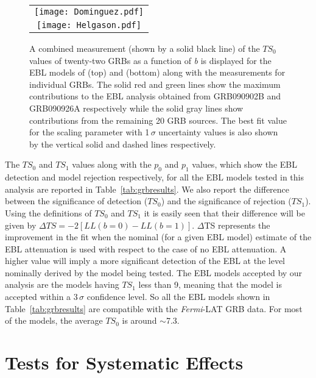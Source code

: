 \documentclass[12pt,preprint]{aastex}
\begin{document}
\begin{figure*}[ht!]
  \begin{center}
  \begin{tabular}{c}
    \texttt{[image: Dominguez.pdf]}\\ 
    \texttt{[image: Helgason.pdf]} 
\end{tabular}
  \end{center}
  \caption{A combined measurement {(shown by a solid black line)} of the $TS_0$ values of {twenty-two} GRBs as a function of {\it b} is displayed for the { EBL models of \cite{dominguez11} (top) and \cite{helgason12} (bottom)} {along with the measurements for individual GRBs.}  {The solid red and green lines show the maximum contributions to the EBL analysis obtained 
  from GRB090902B and GRB090926A respectively while the solid gray lines show contributions from the remaining 20 GRB sources. The best fit value for the scaling parameter with 1\,$\sigma$ uncertainty values is also shown by the vertical solid and dashed lines respectively.}}
\label{fig:TS}
\end{figure*}


The $TS_0$ and $TS_1$ values {along with the $p_0$ and $p_1$ values}, which show the EBL detection and model rejection respectively, for
all the EBL models tested in this analysis are reported in Table~\ref{tab:grbresults}. { We also report the difference between the significance of detection ($TS_0$) and the significance of rejection ($TS_1$). Using the definitions of $TS_0$ and $TS_1$ it is easily seen that their difference will be given by $\Delta TS=-2 [LL(b=0) - LL(b=1)]$. $\Delta$TS represents the improvement in the fit when the nominal (for a given EBL model) estimate of the EBL attenuation is used with respect to the case of no EBL attenuation. A higher value will imply a more significant detection of the EBL at the level nominally derived by the model being tested.}
The EBL models accepted by our analysis are the models having $TS_1$ less than 9, meaning that the model is 
accepted within a 3\,$\sigma$ confidence level. So all the EBL models shown in Table~\ref{tab:grbresults} are compatible with the {\it Fermi}-LAT
GRB data.
For most of the models, the average $TS_0$ is around $\sim$7.3.



\section{Tests for Systematic Effects}
\label{sec:addtests}
\end{document}
